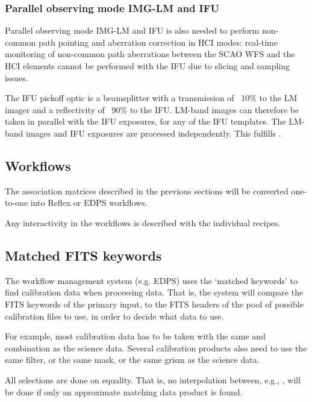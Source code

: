 \subsubsection{Parallel observing mode IMG-LM and IFU}\label{sssec:parallellmifu}
Parallel observing mode IMG-LM and IFU is also needed to perform non-common path pointing and aberration correction in \ac{HCI} modes:
real-time monitoring of non-common path aberrations between the \ac{SCAO} \ac{WFS} and the \ac{HCI} elements cannot be performed with the \ac{IFU} due to slicing and sampling issues.

The IFU pickoff optic is a beamsplitter with a transmission of ~10\% to the LM imager and a reflectivity of ~90\% to the IFU. %
LM-band images can therefore be taken in parallel with the IFU exposures, for any of the IFU templates.
The LM-band images and IFU exposures are processed independently.
This fulfills .


\subsection{Workflows}
The association matrices described in the previous sections will be converted one-to-one into Reflex or \ac{EDPS} workflows.

Any interactivity in the workflows is described with the individual recipes.


\subsection{Matched FITS keywords}

The workflow management system (e.g. \ac{EDPS}) uses the `matched keywords'
to find calibration data when processing data.
That is, the system will compare the FITS keywords of the primary input, to
the FITS headers of the pool of possible calibration files to use, in order
to decide what data to use.

For example, most calibration data has to be taken with the same 
and  combination as the science data.
Several calibration products also need to use the same filter, or the same mask, or the same grism as the science data.

All selections are done on equality.
That is, no interpolation between, e.g., , will be done if only an approximate matching data product is found.

